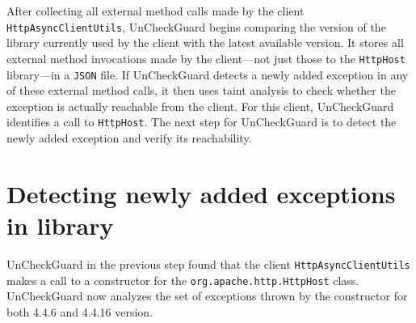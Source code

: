 After collecting all external method calls made by the client \texttt{HttpAsyncClientUtils}, UnCheckGuard begins comparing the version of the library currently used by the client with the latest available version. It stores all external method invocations made by the client—not just those to the \texttt{HttpHost} library---in a \texttt{JSON} file. If UnCheckGuard detects a newly added exception in any of these external method calls, it then uses taint analysis to check whether the exception is actually reachable from the client. For this client, UnCheckGuard identifies a call to \texttt{HttpHost}. The next step for UnCheckGuard is to detect the newly added exception and verify its reachability.



\section{Detecting newly added exceptions in library} 

UnCheckGuard in the previous step found that the client \texttt{HttpAsyncClientUtils} makes a call to a constructor for the \texttt{org.apache.http.HttpHost} class. UnCheckGuard now analyzes the set of exceptions thrown by the constructor for both 4.4.6 and 4.4.16 version.


